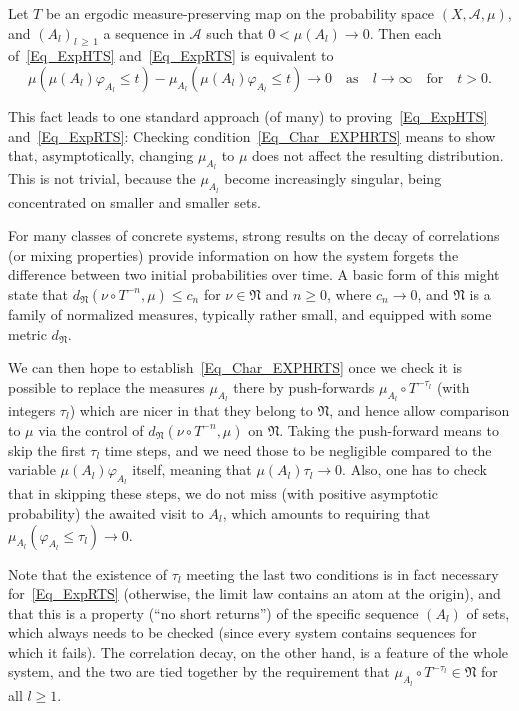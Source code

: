 \documentclass[10pt]{amsart}
\theoremstyle{definition}\newtheorem{defi}[theo]{Definition}\newtheorem{rema}[theo]{Remark}\newtheorem{exam}[theo]{Example}\newtheorem{exem}[theo]{Example}\newtheorem{nota}[theo]{Notation}
\newcommand{\clA}{\mathcal{A}}
\newcommand{\frkN}{\mathfrak{N}}
\begin{document}
\begin{prop}\label{prop1.1}
Let $T$ be an ergodic measure-preserving map on the probability space $(X,\clA,\mu)$, and $(A_{l})_{l\,\geq\,1}$ a sequence in $\clA$ such that $0<\mu (A_{l})\rightarrow0$. Then each of~\eqref{Eq_ExpHTS} and~\eqref{Eq_ExpRTS} is equivalent to
\begin{equation}\label{Eq_Char_EXPHRTS}
\mu\left(\mu(A_{l})\varphi_{A_{l}}\leq t\right)-\mu_{A_{l}}\left(\mu(A_{l})\varphi_{A_{l}}\leq t\right)\longrightarrow0\quad \text{as}\quad l\rightarrow\infty\quad \text{for}\quad t>0. 
\end{equation}
\end{prop}

This fact leads to one standard approach (of many) to proving~\eqref{Eq_ExpHTS} and~\eqref{Eq_ExpRTS}: Checking condition~\eqref{Eq_Char_EXPHRTS} means to show that, asymptotically, changing $\mu_{A_{l}}$ to $\mu$ does not affect the resulting distribution. This is not trivial, because the $\mu_{A_{l}}$ become increasingly singular, being concentrated on smaller and smaller sets.

For many classes of concrete systems, strong results on the decay of correlations (or mixing properties) provide information on how the system forgets the difference between two initial probabilities over time. A basic form of this might state that $d_{\frkN}(\nu\circ T^{-n},\mu)\leq c_{n}$ for $\nu\in\frkN$ and $n\geq0$, where $c_{n}\rightarrow0$, and $\frkN$ is a family of normalized measures, typically rather small, and equipped with some metric $d_{\frkN}$.

We can then hope to establish~\eqref{Eq_Char_EXPHRTS} once we check it is possible to replace the measures $\mu_{A_{l}}$ there by push-forwards $\mu_{A_{l}}\circ T^{-\tau_{l}}$ (with integers $\tau_{l}$) which are nicer in that they belong to $\frkN$, and hence allow comparison to $\mu$ via the control of $d_{\frkN}(\nu\circ T^{-n},\mu)$ on $\frkN$. Taking the push-forward means to skip the first $\tau_{l}$ time steps, and we need those to be negligible compared to the variable $\mu(A_{l})\varphi _{A_{l}}$ itself, meaning that $\mu(A_{l})\tau_{l}\rightarrow0$. Also, one has to check that in skipping these steps, we do not miss (with positive asymptotic probability) the awaited visit to $A_{l}$, which amounts to requiring that $\mu_{A_{l}}(\varphi_{A_{l}}\leq\tau_{l})\longrightarrow0$.

Note that the existence of $\tau_{l}$ meeting the last two conditions is in fact necessary for~\eqref{Eq_ExpRTS} (otherwise, the limit law contains an atom at the origin), and that this is a property (``no short returns'') of the specific sequence $(A_{l})$ of sets, which always needs to be checked (since every system contains sequences for which it fails). The correlation decay, on the other hand, is a feature of the whole system, and the two are tied together by the requirement that $\mu_{A_{l} }\circ T^{-\tau_{l}}\in\frkN$ for all $l\geq1$.
\end{document}
